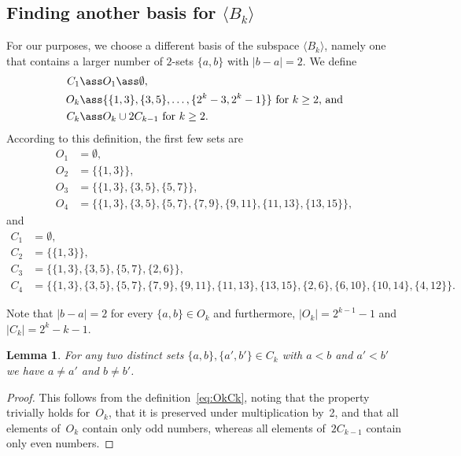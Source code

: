 \documentclass[a4paper,11pt,reqno]{amsart}
\newtheorem{lemma}[theorem]{Lemma}
\begin{document}
\subsection{Finding another basis for $\langle B_k\rangle$}

For our purposes, we choose a different basis of the subspace $\langle B_k\rangle$, namely one that contains a larger number of $2$-sets $\{a,b\}$ with $|b-a|=2$.
We define
\begin{equation}
\label{eq:OkCk}
\begin{split}
C_1&\ass O_1\ass \emptyset,\\
O_k&\ass \{\{1,3\},\{3,5\},\ldots,\{2^k-3,2^k-1\}\} \text{ for $k\geq 2$, and} \\
C_k& \ass O_k\cup 2C_{k-1} \text{ for } k\geq 2.
\end{split}
\end{equation}
According to this definition, the first few sets are
\[
\begin{split}
O_1&=\emptyset, \\
O_2&=\{\{1,3\}\}, \\
O_3&=\{\{1,3\},\{3,5\},\{5,7\}\}, \\
O_4&=\{\{1,3\},\{3,5\},\{5,7\},\{7,9\},\{9,11\},\{11,13\},\{13,15\}\},
\end{split}
\]
and
\[
\label{eq:C14}
\begin{split}
C_1&=\emptyset, \\
C_2&=\{\{1,3\}\}, \\
C_3&=\{\{1,3\},\{3,5\},\{5,7\},\{2,6\}\}, \\
C_4&=\{\{1,3\},\{3,5\},\{5,7\},\{7,9\},\{9,11\},\{11,13\},\{13,15\},\{2,6\},\{6,10\},\{10,14\},\{4,12\}\}.
\end{split}
\]

Note that $|b-a|=2$ for every $\{a,b\}\in O_k$ and furthermore, $|O_k|=2^{k-1}-1$ and $|C_k|=2^k-k-1$.

\begin{lemma}
\label{lem:Cdiff}
For any two distinct sets $\{a,b\},\{a',b'\}\in C_k$ with $a<b$ and $a'<b'$ we have $a \ne a'$ and $b\ne b'$.
\end{lemma}

\begin{proof}
This follows from the definition~\eqref{eq:OkCk}, noting that the property trivially holds for~$O_k$, that it is preserved under multiplication by~2, and that all elements of~$O_k$ contain only odd numbers, whereas all elements of~$2C_{k-1}$ contain only even numbers.
\end{proof}
\end{document}
